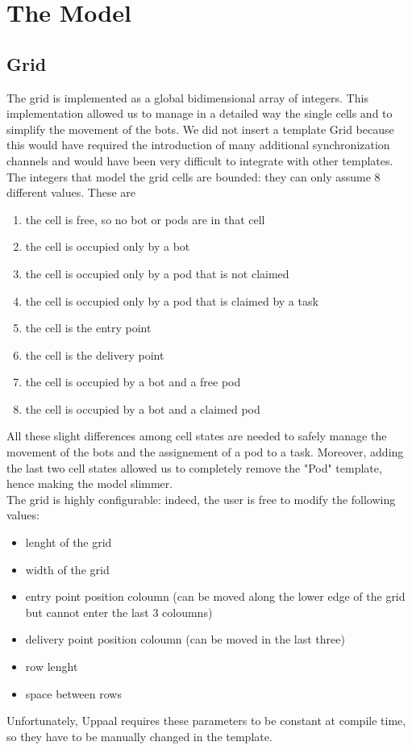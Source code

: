 \documentclass{article}
\begin{document}
	\tableofcontents
	\clearpage
	
	\section{The Model}
		\subsection{Grid}
			The grid is implemented as a global bidimensional array of integers. This implementation allowed us to manage in a detailed way the single cells and to simplify the movement of the bots. We did not insert a template Grid because this would have required the introduction of many additional synchronization channels and would have been very difficult to integrate with other templates.
			The integers that model the grid cells are bounded: they can only assume 8 different values. These are
			\begin{enumerate}[start=0, label={\arabic* :}]
				\item the cell is free, so no bot or pods are in that cell
				\item the cell is occupied only by a bot
				\item the cell is occupied only by a pod that is not claimed
				\item the cell is occupied only by a pod that is claimed by a task 
				\item the cell is the entry point 
				\item the cell is the delivery point
				\item the cell is occupied by a bot and a free pod
				\item the cell is occupied by a bot and a claimed pod
			\end{enumerate}
			All these slight differences among cell states are needed to safely manage the movement of the bots and the assignement of a pod to a task. Moreover, adding the last two cell states allowed us to completely remove the "Pod" template, hence making the model slimmer.\\
			The grid is highly configurable: indeed, the user is free to modify the following values:
			\begin{itemize}
				\item lenght of the grid
				\item width of the grid
				\item entry point position coloumn (can be moved along the lower edge of the grid but cannot enter the last 3 coloumns) 
				\item delivery point position coloumn (can be moved in the last three)
				\item row lenght
				\item space between rows
			\end{itemize}
			Unfortunately, Uppaal requires these parameters to be constant at compile time, so they have to be manually changed in the template. 
			
\end{document}
